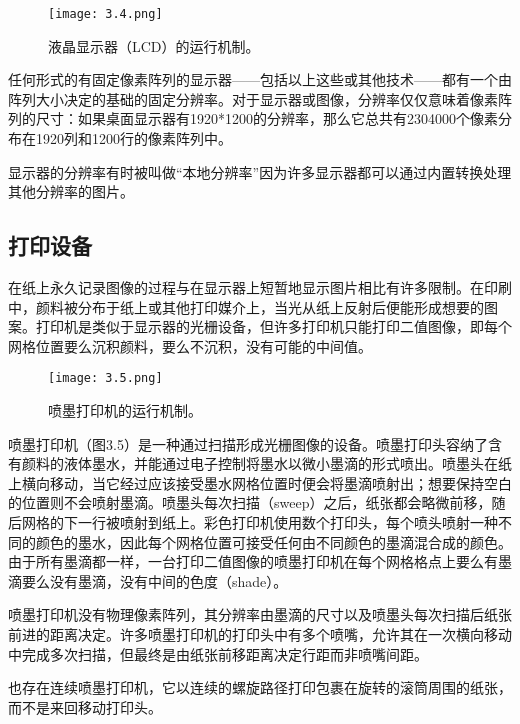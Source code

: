 \documentclass[lang=cn,12pt]{elegantbook}
\begin{document}
\begin{figure}[htb]
  \centering
  \texttt{[image: 3.4.png]}
  \caption{液晶显示器（LCD）的运行机制。}
\end{figure}

任何形式的有固定像素阵列的显示器——包括以上这些或其他技术——都有一个由阵列大小决定的基础的固定分辨率。对于显示器或图像，分辨率仅仅意味着像素阵列的尺寸：如果桌面显示器有1920*1200的分辨率，那么它总共有2304000个像素分布在1920列和1200行的像素阵列中。

\begin{note}
  显示器的分辨率有时被叫做“本地分辨率”因为许多显示器都可以通过内置转换处理其他分辨率的图片。
\end{note}

\subsection{打印设备}

在纸上永久记录图像的过程与在显示器上短暂地显示图片相比有许多限制。在印刷中，颜料被分布于纸上或其他打印媒介上，当光从纸上反射后便能形成想要的图案。打印机是类似于显示器的光栅设备，但许多打印机只能打印二值图像，即每个网格位置要么沉积颜料，要么不沉积，没有可能的中间值。

\begin{figure}[htb]
  \centering
  \texttt{[image: 3.5.png]}
  \caption{喷墨打印机的运行机制。}
\end{figure}

喷墨打印机（图3.5）是一种通过扫描形成光栅图像的设备。喷墨打印头容纳了含有颜料的液体墨水，并能通过电子控制将墨水以微小墨滴的形式喷出。喷墨头在纸上横向移动，当它经过应该接受墨水网格位置时便会将墨滴喷射出；想要保持空白的位置则不会喷射墨滴。喷墨头每次扫描（sweep）之后，纸张都会略微前移，随后网格的下一行被喷射到纸上。彩色打印机使用数个打印头，每个喷头喷射一种不同的颜色的墨水，因此每个网格位置可接受任何由不同颜色的墨滴混合成的颜色。由于所有墨滴都一样，一台打印二值图像的喷墨打印机在每个网格格点上要么有墨滴要么没有墨滴，没有中间的色度（shade）。

喷墨打印机没有物理像素阵列，其分辨率由墨滴的尺寸以及喷墨头每次扫描后纸张前进的距离决定。许多喷墨打印机的打印头中有多个喷嘴，允许其在一次横向移动中完成多次扫描，但最终是由纸张前移距离决定行距而非喷嘴间距。

\begin{note}
  也存在连续喷墨打印机，它以连续的螺旋路径打印包裹在旋转的滚筒周围的纸张，而不是来回移动打印头。
\end{note}
\end{document}

